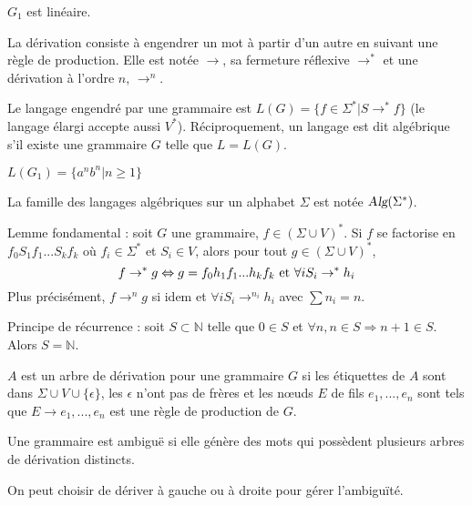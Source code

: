\documentclass[a4paper]{article}
\begin{document}
\begin{ex}$G_1$ est linéaire.\end{ex}

La dérivation consiste à engendrer un mot à partir d'un autre en suivant une règle de production. Elle est notée $\rightarrow$, sa fermeture réflexive $\rightarrow^*$ et une dérivation à l'ordre $n$, $\rightarrow^n$.

\begin{defi}
Le langage engendré par une grammaire est $L(G) = \{f\in\Sigma^* | S\rightarrow^*f\}$ (le langage élargi accepte aussi $V^*$). Réciproquement, un langage est dit algébrique s'il existe une grammaire $G$ telle que $L=L(G)$.
\end{defi}


\begin{ex}$L(G_1)=\{a^nb^n | n\geqslant1\}$\end{ex}

La famille des langages algébriques sur un alphabet $\Sigma$ est notée $\textsl{Alg}(\Sigma^*)$.

\begin{lem}
Lemme fondamental : soit $G$ une grammaire, $f\in(\Sigma\cup V)^*$. Si $f$ se factorise en $f_0S_1f_1...S_kf_k$ où $f_i\in\Sigma^*$ et $S_i\in V$, alors pour tout $g\in(\Sigma\cup V)^*$, $$f\rightarrow^*g \Leftrightarrow g=f_0h_1f_1...h_kf_k \textnormal{ et }\forall i S_i\rightarrow^*h_i$$
Plus précisément, $f\rightarrow^ng$ si idem et $\forall i S_i\rightarrow^{n_i}h_i$ avec $\sum n_i = n$.
\end{lem}

\begin{prop}
Principe de récurrence : soit $S\subset\mathbb{N}$ telle que $0\in S$ et $\forall n, n\in S \Rightarrow n+1\in S$. Alors $S=\mathbb{N}$.
\end{prop}


\begin{defi}
$A$ est un arbre de dérivation pour une grammaire $G$ si les étiquettes de $A$ sont dans $\Sigma\cup V\cup\{\epsilon\}$, les $\epsilon$ n'ont pas de frères et les n\oe uds $E$ de fils $e_1,...,e_n$ sont tels que $E\rightarrow e_1,...,e_n$ est une règle de production de $G$.
\end{defi}


\begin{defi}
Une grammaire est ambiguë si elle génère des mots qui possèdent plusieurs arbres de dérivation distincts.
\end{defi}

On peut choisir de dériver à gauche ou à droite pour gérer l'ambiguïté.
\end{document}
